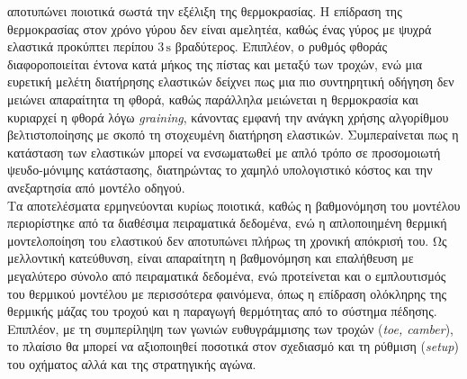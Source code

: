 αποτυπώνει ποιοτικά σωστά την εξέλιξη της θερμοκρασίας. Η επίδραση της θερμοκρασίας στον χρόνο γύρου δεν
είναι αμελητέα, καθώς ένας γύρος με ψυχρά ελαστικά προκύπτει περίπου $3\,\mathrm{s}$ βραδύτερος. Επιπλέον,
ο ρυθμός φθοράς διαφοροποιείται έντονα κατά μήκος της πίστας και μεταξύ των τροχών, ενώ μια ευρετική
μελέτη διατήρησης ελαστικών δείχνει πως μια πιο συντηρητική οδήγηση δεν μειώνει απαραίτητα τη φθορά,
καθώς παράλληλα μειώνεται η θερμοκρασία και κυριαρχεί η φθορά λόγω \textit{graining}, κάνοντας εμφανή την ανάγκη χρήσης αλγορίθμου βελτιστοποίησης με σκοπό τη στοχευμένη διατήρηση ελαστικών. Συμπεραίνεται πως η κατάσταση των ελαστικών μπορεί να ενσωματωθεί με απλό
τρόπο σε προσομοιωτή ψευδο-μόνιμης κατάστασης, διατηρώντας το χαμηλό υπολογιστικό κόστος και την
ανεξαρτησία από μοντέλο οδηγού.\\[8pt]
\noindent
Τα αποτελέσματα ερμηνεύονται κυρίως ποιοτικά, καθώς η βαθμονόμηση του μοντέλου περιορίστηκε από τα διαθέσιμα πειραματικά δεδομένα, ενώ η απλοποιημένη θερμική μοντελοποίηση του ελαστικού δεν αποτυπώνει πλήρως τη χρονική απόκρισή του. Ως μελλοντική κατεύθυνση, είναι απαραίτητη η βαθμονόμηση και επαλήθευση με μεγαλύτερο σύνολο από πειραματικά δεδομένα, ενώ προτείνεται και ο εμπλουτισμός του θερμικού μοντέλου με περισσότερα φαινόμενα, όπως η επίδραση ολόκληρης της θερμικής μάζας του τροχού και η παραγωγή θερμότητας από το σύστημα πέδησης. Επιπλέον, με τη συμπερίληψη των γωνιών ευθυγράμμισης των τροχών (\textit{toe, camber}), το πλαίσιο θα μπορεί να αξιοποιηθεί ποσοτικά στον σχεδιασμό και τη ρύθμιση (\textit{setup}) του οχήματος αλλά και της στρατηγικής αγώνα.